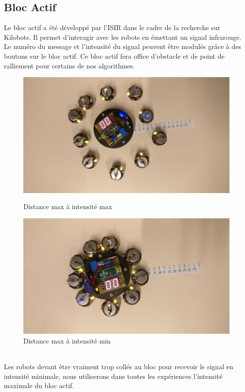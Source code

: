 \documentclass[a4paper]{article}
\begin{document}
\subsection{Bloc Actif}
Le bloc actif a été développé par l'ISIR dans le cadre de la recherche sur Kilobots. Il permet d'interagir avec les robots en émettant un signal infrarouge. Le numéro du message et l'intensité du signal peuvent être modulés grâce à des boutons sur le bloc actif. Ce bloc actif fera office d'obstacle et de point de ralliement pour certains de nos algorithmes.\\
\begin{figure}[h]
	\begin{minipage}[c]{.46\linewidth}
		\centering
		\includegraphics[width=1.1\linewidth]{../../script_results/bloc_actif_max.jpg}
		\caption{Distance max à intensité max}
	\end{minipage}
	\hfill%
	\begin{minipage}[c]{.46\linewidth}
		\centering
		\includegraphics[width=1.1\linewidth]{../../script_results/bloc_actif_min.jpg}
		\caption{Distance max à intensité min}
	\end{minipage}
\end{figure}
\\
Les robots devant être vraiment trop collés au bloc pour recevoir le signal en intensité minimale, nous utiliserons dans toutes les expériences l'intensité maximale du bloc actif.
\end{document}
